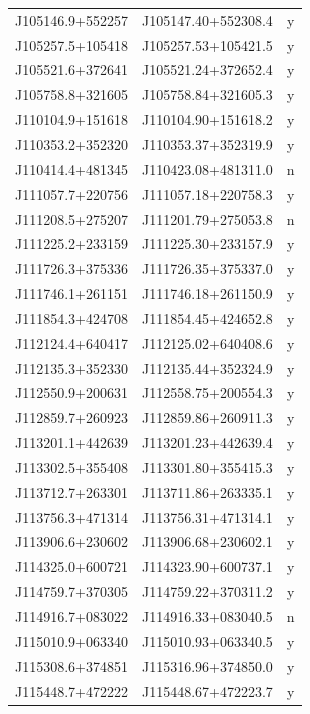\begin{table}
\begin{tabular}{ccc}
        J105146.9+552257 & J105147.40+552308.4 & y\\
        J105257.5+105418 & J105257.53+105421.5 & y\\
        J105521.6+372641 & J105521.24+372652.4 & y\\
        J105758.8+321605 & J105758.84+321605.3 & y\\
        J110104.9+151618 & J110104.90+151618.2 & y\\
        J110353.2+352320 & J110353.37+352319.9 & y\\
        J110414.4+481345 & J110423.08+481311.0 & n\\
        J111057.7+220756 & J111057.18+220758.3 & y\\
        J111208.5+275207 & J111201.79+275053.8 & n\\
        J111225.2+233159 & J111225.30+233157.9 & y\\
        J111726.3+375336 & J111726.35+375337.0 & y\\
        J111746.1+261151 & J111746.18+261150.9 & y\\
        J111854.3+424708 & J111854.45+424652.8 & y\\
        J112124.4+640417 & J112125.02+640408.6 & y\\
        J112135.3+352330 & J112135.44+352324.9 & y\\
        J112550.9+200631 & J112558.75+200554.3 & y\\
        J112859.7+260923 & J112859.86+260911.3 & y\\
        J113201.1+442639 & J113201.23+442639.4 & y\\
        J113302.5+355408 & J113301.80+355415.3 & y\\
        J113712.7+263301 & J113711.86+263335.1 & y\\
        J113756.3+471314 & J113756.31+471314.1 & y\\
        J113906.6+230602 & J113906.68+230602.1 & y\\
        J114325.0+600721 & J114323.90+600737.1 & y\\
        J114759.7+370305 & J114759.22+370311.2 & y\\
        J114916.7+083022 & J114916.33+083040.5 & n\\
        J115010.9+063340 & J115010.93+063340.5 & y\\
        J115308.6+374851 & J115316.96+374850.0 & y\\
        J115448.7+472222 & J115448.67+472223.7 & y\\

\end{tabular}
\end{table}
